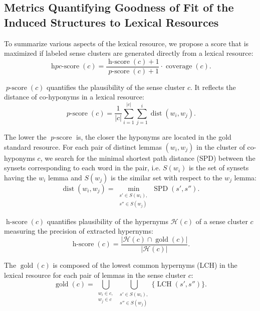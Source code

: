 \documentclass[10pt, a4paper]{article}
\DeclareMathOperator{\coverage}{coverage}
\DeclareMathOperator{\dist}{dist}
\DeclareMathOperator{\SPD}{SPD}
\DeclareMathOperator{\pscore}{\mathit{p}-score}
\DeclareMathOperator{\gold}{gold}
\DeclareMathOperator{\LCH}{LCH}
\DeclareMathOperator{\hscore}{\mathit{h}-score}
\DeclareMathOperator{\hpcscore}{\mathit{hpc}-score}
\begin{document}
\subsection{Metrics Quantifying Goodness of Fit of the Induced Structures to  Lexical Resources}
To summarize various aspects of the lexical resource, we propose a score that is maximized if  labeled sense clusters are generated directly from a lexical resource:
%
\begin{equation}
  \hpcscore(c) = \frac{\hscore(c) + 1}{\pscore(c) + 1} \cdot \coverage(c)\text{.}
\end{equation}

$\pscore(c)$ quantifies the plausibility of the sense cluster $c$. It  reflects the distance of co-hyponyms in a lexical resource:
%
\begin{equation}
  \pscore(c) = \frac{1}{\left\vert{}c\right\vert} \sum^{\left\vert{}c\right\vert}_{i=1} \sum^i_{j=1} \dist(w_i, w_j)\text{.}
\end{equation}

The lower the $\pscore$ is, the closer the hyponyms are located in the gold standard resource. For each pair of distinct lemmas $(w_i, w_j)$ in the cluster of co-hyponyms $c$, we search for the minimal shortest path distance (SPD) between the synsets corresponding to each word in the pair, i.e. $S(w_i)$ is the set of synsets having the $w_i$ lemma and $S(w_j)$ is the similar set with respect to the $w_j$ lemma:
%
\begin{equation}
  \dist(w_i, w_j) = \min_{\substack{s' \in S(w_i),\\s'' \in S(w_j)}} \SPD(s', s'')\text{.}
\end{equation}

$\hscore(c)$ quantifies plausibility of the hypernyms $\mathcal{H}(c)$ of a sense cluster $c$ measuring the precision of extracted hypernyms:
%
\begin{equation}
  \hscore(c) = \frac{\left\vert\mathcal{H}(c) \cap \gold(c)\right\vert}{\left\vert\mathcal{H}(c)\right\vert}\text{.}
\end{equation}

The $\gold(c)$ is composed of the lowest common hypernyms (LCH) in the lexical resource for each pair of lemmas in the sense cluster $c$:
%
\begin{equation}
  \gold(c) = \bigcup_{\substack{w_i \in c,\\w_j \in c}} \bigcup_{\substack{s' \in S(w_i),\\s'' \in S(w_j)}} \{\LCH(s', s'')\}\text{.}
\end{equation}
\end{document}

